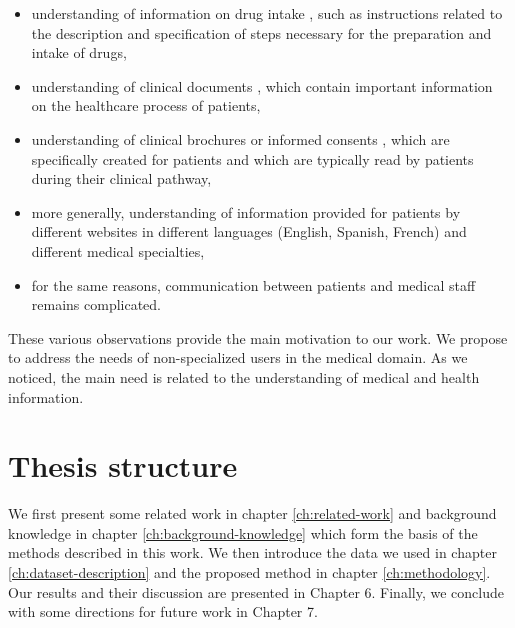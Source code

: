 \begin{itemize}
    \item  understanding of information on drug intake \citep{VanderStichele-WILEY1999,Patel-IJMI2002}, such as instructions related to the description and specification of steps necessary for the preparation and intake of drugs,
    
    \item  understanding of clinical documents \citep{Zeng-MEDINFO2007}, which contain important information on the healthcare process of patients,
    
    \item  understanding of clinical brochures or informed consents \citep{Williams-JAMA1995}, which are specifically created for patients and which are typically read by patients during their clinical pathway,
    
    \item  more generally, understanding of information provided for patients by different websites \citep{Oregon-2008,Brigo-EB2015} in different languages (English, Spanish, French) and different medical specialties,
    
    \item  for the same reasons, communication between patients and medical staff \citep{Jucks-HC2007,Tran-EC2009} remains complicated.
\end{itemize}
These various observations provide the main motivation to our work. We propose to address the needs of non-specialized users in the medical domain. As we noticed, the main need is related to the understanding of medical and health information. 

\section{Thesis structure}
We first present some related work in chapter \ref{ch:related-work} and background knowledge in chapter \ref{ch:background-knowledge} which form the basis of the methods described in this work. We then introduce the data we used in chapter \ref{ch:dataset-description} and the proposed method in chapter \ref{ch:methodology}. Our results and their discussion are presented in Chapter 6. Finally, we conclude with some directions for future work in Chapter 7.
